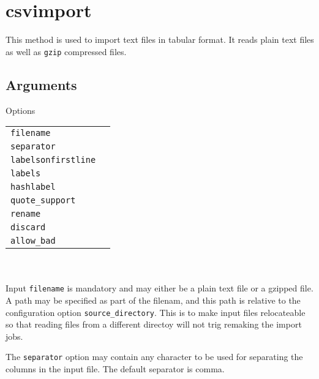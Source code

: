 \section{csvimport}

This method is used to import text files in tabular format.  It reads
plain text files as well as \texttt{gzip} compressed files.

\subsection{Arguments}

\noindent Options\\

\begin{tabular}{ll}
  \texttt{filename} & \\ %
  \texttt{separator} & \\ %
  \texttt{labelsonfirstline} & \\ %
  \texttt{labels} & \\ %
  \texttt{hashlabel} & \\ %
  \texttt{quote\_support} \\ %
  \texttt{rename} & \\ %
  \texttt{discard} & \\ %
  \texttt{allow\_bad} & \\ %
\end{tabular}\\
\\

Input \texttt{filename} is mandatory and may either be a plain text
file or a gzipped file.  A path may be specified as part of the
filenam, and this path is relative to the configuration option
\texttt{source\_directory}.  This is to make input files relocateable
so that reading files from a different directoy will not trig remaking
the import jobs.

The \texttt{separator} option may contain any character to be used for
separating the columns in the input file.  The default separator is
comma.

